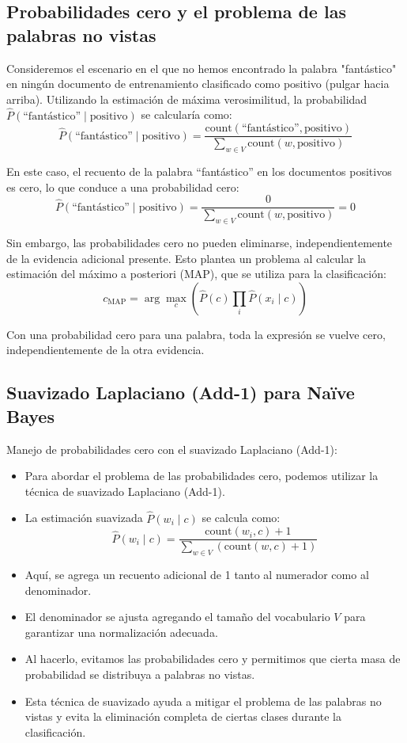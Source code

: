 \documentclass[11pt,fleqn]{book} %
\begin{document}
\subsection{Probabilidades cero y el problema de las palabras no vistas}

Consideremos el escenario en el que no hemos encontrado la palabra "fantástico" en ningún documento de entrenamiento clasificado como positivo (pulgar hacia arriba). Utilizando la estimación de máxima verosimilitud, la probabilidad $\hat{P}(\text{``fantástico''} \mid \text{positivo})$ se calcularía como:
\[
\hat{P}(\text{``fantástico''} \mid \text{positivo}) = \frac{\text{count}(\text{``fantástico''}, \text{positivo})}{\sum_{w \in V} \text{count}(w, \text{positivo})}
\]

En este caso, el recuento de la palabra ``fantástico'' en los documentos positivos es cero, lo que conduce a una probabilidad cero:
\[
\hat{P}(\text{``fantástico''} \mid \text{positivo}) = \frac{0}{\sum_{w \in V} \text{count}(w, \text{positivo})} = 0
\]

Sin embargo, las probabilidades cero no pueden eliminarse, independientemente de la evidencia adicional presente. Esto plantea un problema al calcular la estimación del máximo a posteriori (MAP), que se utiliza para la clasificación:
\[
c_{\text{MAP}} = \arg\max_c \left(\hat{P}(c) \prod_{i} \hat{P}(x_i \mid c)\right)
\]

Con una probabilidad cero para una palabra, toda la expresión se vuelve cero, independientemente de la otra evidencia.

\subsection{Suavizado Laplaciano (Add-1) para Naïve Bayes}

Manejo de probabilidades cero con el suavizado Laplaciano (Add-1):
\begin{itemize}
    \item Para abordar el problema de las probabilidades cero, podemos utilizar la técnica de suavizado Laplaciano (Add-1).
    \item La estimación suavizada $\hat{P}(w_i \mid c)$ se calcula como:
    \[
    \hat{P}(w_i \mid c) = \frac{\text{count}(w_i, c) + 1}{\sum_{w \in V} (\text{count}(w, c) + 1)}
    \]
    \item Aquí, se agrega un recuento adicional de 1 tanto al numerador como al denominador.
    \item El denominador se ajusta agregando el tamaño del vocabulario $V$ para garantizar una normalización adecuada.
    \item Al hacerlo, evitamos las probabilidades cero y permitimos que cierta masa de probabilidad se distribuya a palabras no vistas.
    \item Esta técnica de suavizado ayuda a mitigar el problema de las palabras no vistas y evita la eliminación completa de ciertas clases durante la clasificación.
\end{itemize}
\end{document}
